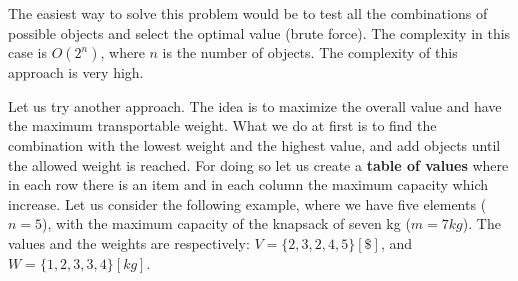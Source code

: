 The easiest way to solve this problem would be to test all the combinations of possible objects and select the optimal value (brute force). The complexity in this case is \(O(2^{n})\), where \(n\) is the number of objects. The complexity of this approach is very high.

Let us try another approach. The idea is to maximize the overall value and have the maximum transportable weight. What we do at first is to find the combination with the lowest weight and the highest value, and add objects until the allowed weight is reached. For doing so let us create a \textbf{table of values} where in each row there is an item and in each column the maximum capacity which increase. Let us consider the following example, where we have five elements (\(n=5\)), with the maximum capacity of the knapsack of seven kg (\(m=7kg\)). The values and the weights are respectively: \(V= \lbrace 2, 3, 2, 4, 5 \rbrace[\$]\), and \(W= \lbrace 1, 2, 3, 3, 4 \rbrace [kg]\).


